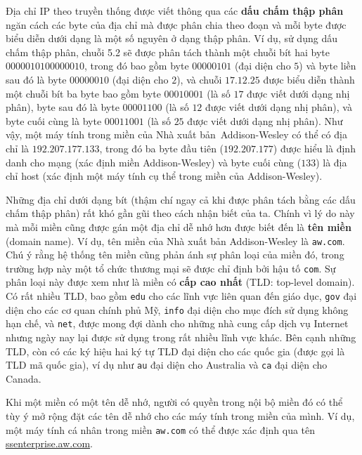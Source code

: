 Địa chỉ IP theo truyền thống được viết thông qua các \textbf{dấu chấm thập phân} ngăn cách
các byte của địa chỉ mà được phân chia theo đoạn và mỗi byte được biểu diễn dưới dạng là
một số nguyên ở dạng thập phân. Ví dụ, sử dụng dấu chấm thập phân, chuỗi 5.2 sẽ được phân
tách thành một chuỗi bít hai byte $0000010100000010$, trong đó bao gồm byte $00000101$
(đại diện cho $5$) và byte liền sau đó là byte $00000010$ (đại diện cho $2$), và chuỗi
$17.12.25$ được biểu diễn thành một chuỗi bít ba byte bao gồm byte $00010001$ (là số $17$
được viết dưới dạng nhị phân), byte sau đó là byte $00001100$ (là số $12$ được viết dưới
dạng nhị phân), và byte cuối cùng là byte $00011001$ (là số $25$ được viết dưới dạng nhị
phân). Như vậy, một máy tính trong miền của Nhà xuất bản~Addison-Wesley có thể có địa chỉ
là $192.207.177.133$, trong đó ba byte đầu tiên ($192.207.177$) được hiểu là định danh cho
mạng (xác định miền Addison-Wesley) và byte cuối cùng ($133$) là địa chỉ host (xác định
một máy tính cụ thể trong miền của Addison-Wesley).

Những địa chỉ dưới dạng bít (thậm chí ngay cả khi được phân tách bằng các dấu chấm thập
phân) rất khó gần gũi theo cách nhận biết của ta. Chính vì lý do này mà mỗi miền cũng được
gán một địa chỉ dễ nhớ hơn được biết đến là \textbf{tên miền} (domain name). Ví dụ, tên
miền của Nhà xuất bản Addison-Wesley là \texttt{aw.com}. Chú ý rằng hệ thống tên miền cũng
phản ánh sự phân loại của miền đó, trong trường hợp này một tổ chức thương mại sẽ được chỉ
định bởi hậu tố \texttt{com}. Sự phân loại này được xem như là miền có \textbf{cấp cao
  nhất} (TLD: top-level domain). Có rất nhiều TLD, bao gồm \texttt{edu} cho các lĩnh vực
liên quan đến giáo dục, \texttt{gov} đại diện cho các cơ quan chính phủ Mỹ, \texttt{info}
đại diện cho mục đích sử dụng không hạn chế, và \texttt{net}, được mong đợi dành cho những
nhà cung cấp dịch vụ Internet nhưng ngày nay lại được sử dụng trong rất nhiều lĩnh vực
khác. Bên cạnh những TLD, còn có các ký hiệu hai ký tự TLD đại diện cho các quốc gia (được
gọi là TLD mã quốc gia), ví dụ như \texttt{au} đại diện cho Australia và \texttt{ca} đại
diện cho Canada.

Khi một miền có một tên dễ nhớ, người có quyền trong nội bộ miền đó có thể tùy ý mở rộng
đặt các tên dễ nhớ cho các máy tính trong miền của mình. Ví dụ, một máy tính cá nhân trong
miền \texttt{aw.com} có thể được xác định qua tên \url{ssenterprise.aw.com}.


